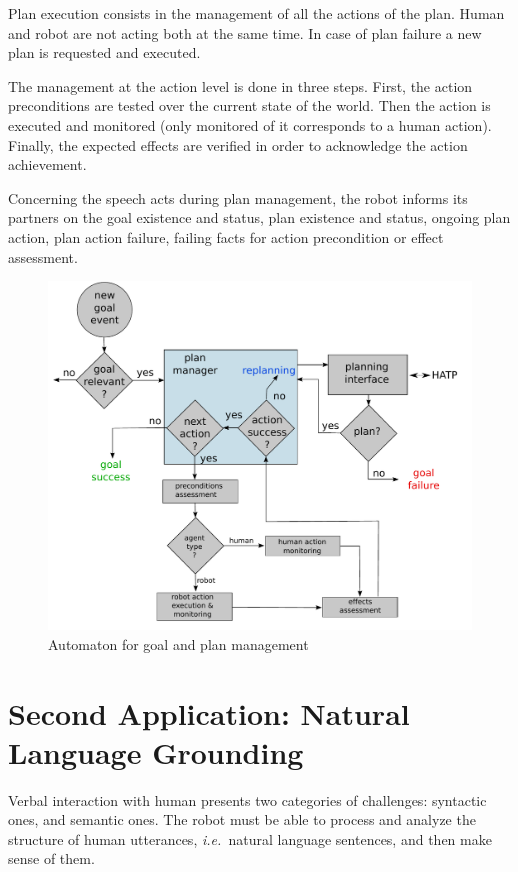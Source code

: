 \documentclass{svmult}
\newcommand{\ie}{{\textit{i.e.~}}}
\begin{document}
Plan execution consists in the management of all the actions of the
plan. Human and robot are not acting both at the same time.  In case
of plan failure a new plan is requested and executed.

The management at the action level is done in three steps. First, the
action preconditions are tested over the current state of the
world. Then the action is executed and monitored (only monitored of it
corresponds to a human action).  Finally, the expected effects are
verified in order to acknowledge the action achievement.

Concerning the speech acts during plan management, the robot informs
its partners on the goal existence and status, plan existence and
status, ongoing plan action, plan action failure, failing facts for
action precondition or effect assessment.

\begin{figure}[thpb]
  \centering
  \includegraphics[width=0.8\columnwidth]{./figs/plan_management.pdf}
  \caption {Automaton for goal and plan management}
  \label{goal_plans_fg}
\end{figure}






\section{Second Application: Natural Language Grounding}
\label{dialog}


Verbal interaction with human presents two categories of challenges: syntactic
ones, and semantic ones. The robot must be able to process and analyze the
structure of human utterances, \ie natural language sentences, and then make
sense of them. 
\end{document}
